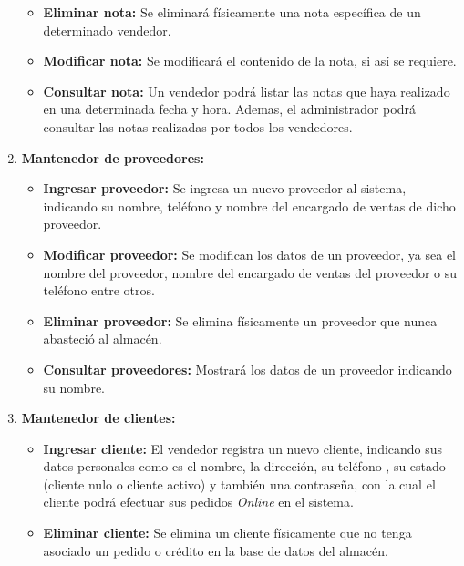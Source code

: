 \documentclass[letterpaper,12pt]{article}
\begin{document}
\begin{enumerate}
\begin{itemize}
\item \textbf{Eliminar nota:}
Se eliminará físicamente una nota específica de un determinado vendedor.

\item \textbf{Modificar nota:} 
Se modificará el contenido de la nota, si así se requiere.

\item \textbf{Consultar nota:}
Un vendedor podrá listar las notas que haya realizado en una determinada fecha y hora.
Ademas, el administrador podrá consultar las notas realizadas por todos los vendedores.

\end{itemize}

\item \textbf{Mantenedor de proveedores:} 

\begin{itemize}
\item \textbf{Ingresar proveedor:}
Se ingresa un nuevo proveedor al sistema, indicando su nombre, teléfono y nombre del encargado 
de ventas de dicho proveedor.

\item \textbf{Modificar proveedor:}
Se modifican los datos de un proveedor, ya sea el nombre del proveedor, nombre del encargado de ventas del proveedor o su teléfono entre otros.

\item \textbf{Eliminar proveedor:}
Se elimina físicamente un proveedor que nunca abasteció al almacén.

\item \textbf{Consultar proveedores:}
Mostrará los datos de un proveedor indicando su nombre.
\end{itemize}

\newpage

\item \textbf{Mantenedor de clientes:} 

\begin{itemize}
\item \textbf{Ingresar cliente: }
El vendedor registra un nuevo cliente, indicando sus datos personales como es el nombre, la dirección, su teléfono , su estado 
(cliente nulo o cliente activo) y también una contraseña, con la cual el cliente podrá efectuar sus pedidos \emph{Online} en el sistema.

\item \textbf{Eliminar cliente: }
Se elimina un cliente físicamente que no tenga asociado un pedido o crédito en la base de datos del almacén.


\end{itemize}
\end{enumerate}
\end{document}
